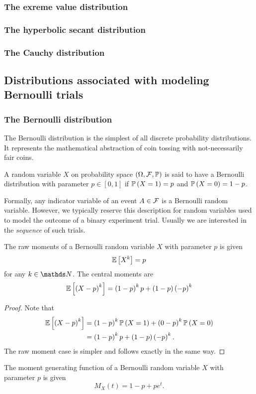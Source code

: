 \subsubsection{The exreme value distribution}

\subsubsection{The hyperbolic secant distribution}

\subsubsection{The Cauchy distribution}

\subsection{Distributions associated with modeling Bernoulli trials}

\subsubsection{The Bernoulli distribution\label{subsec:bernoulliDistribution}}

The Bernoulli distribution is the simplest of all discrete probability
distributions. It represents the mathematical abstraction of coin
tossing with not-necessarily fair coins.
\begin{defn}
\label{def:bernoulliDistribution}A random variable $X$ on probability
space $\probabilityspace$ is said to have a Bernoulli distribution
with parameter $p\in\left[0,1\right]$ if $\P\left(X=1\right)=p$
and $\P\left(X=0\right)=1-p$.
\end{defn}

Formally, any indicator variable of an event $A\in\F$ is a Bernoulli
random variable. However, we typically reserve this description for
random variables used to model the outcome of a binary experiment
trial. Usually we are interested in the \emph{sequence }of such trials.
\begin{prop}
\label{prop:bernoulliMoments}The raw moments of a Bernoulli random
variable $X$ with parameter $p$ is given 
\[
\E\left[X^{k}\right]=p
\]
for any $k\in\N$. The central moments are
\[
\E\left[\left(X-p\right)^{k}\right]=\left(1-p\right)^{k}p+\left(1-p\right)\left(-p\right)^{k}
\]
\end{prop}

\begin{proof}
Note that 
\begin{align*}
\E\left[\left(X-p\right)^{k}\right] & =\left(1-p\right)^{k}\P\left(X=1\right)+\left(0-p\right)^{k}\P\left(X=0\right)\\
 & =\left(1-p\right)^{k}p+\left(1-p\right)\left(-p\right)^{k}.
\end{align*}
The raw moment case is simpler and follows exactly in the same way.
\end{proof}
\begin{prop}
\label{prop:mgfBernoulli}The moment generating function of a Bernoulli
random variable $X$ with parameter $p$ is given
\[
M_{X}\left(t\right)=1-p+pe^{t}.
\]
\end{prop}

